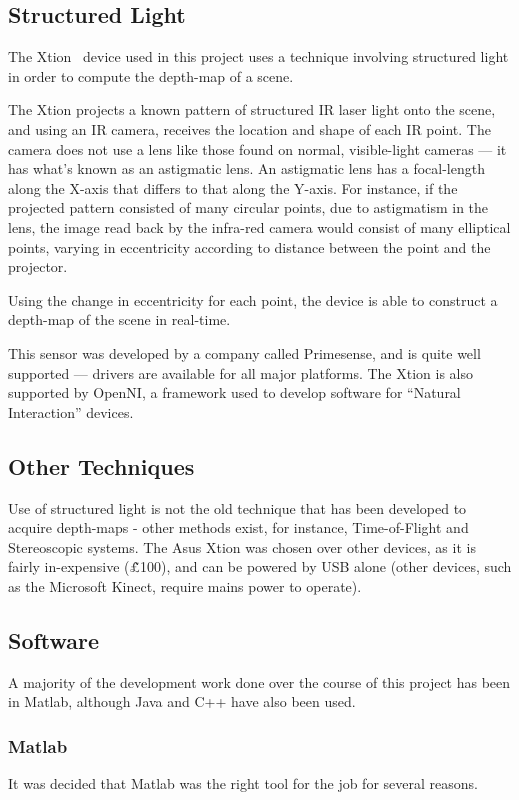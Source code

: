 \subsection{Structured Light}
The Xtion~\cite{xtion} device used in this project uses a technique involving structured light in order to compute the depth-map of a scene.

The Xtion projects a known pattern of structured \ac{IR} laser light onto the scene, and using an \ac{IR} camera, receives the location and shape of each \ac{IR} point. The camera does not use a lens like those found on normal, visible-light cameras --- it has what's known as an astigmatic lens. An astigmatic lens has a focal-length along the X-axis that differs to that along the Y-axis. For instance, if the projected pattern consisted of many circular points, due to astigmatism in the lens, the image read back by the infra-red camera would consist of many elliptical points, varying in eccentricity according to distance between the point and the projector.

Using the change in eccentricity for each point, the device is able to construct a depth-map of the scene in real-time.

This sensor was developed by a company called Primesense, and is quite well supported --- drivers are available for all major platforms. The Xtion is also supported by OpenNI, a framework used to develop software for ``Natural Interaction'' devices. 

\subsection{Other Techniques}
Use of structured light is not the old technique that has been developed to acquire depth-maps - other methods exist, for instance, Time-of-Flight and Stereoscopic systems. The Asus Xtion was chosen over other devices, as it is fairly in-expensive (\~£100), and can be powered by USB alone (other devices, such as the Microsoft Kinect, require mains power to operate). 

\subsection{Software}
A majority of the development work done over the course of this project has been in Matlab, although Java and C++ have also been used.

\subsubsection{Matlab}
It was decided that Matlab was the right tool for the job for several reasons.

